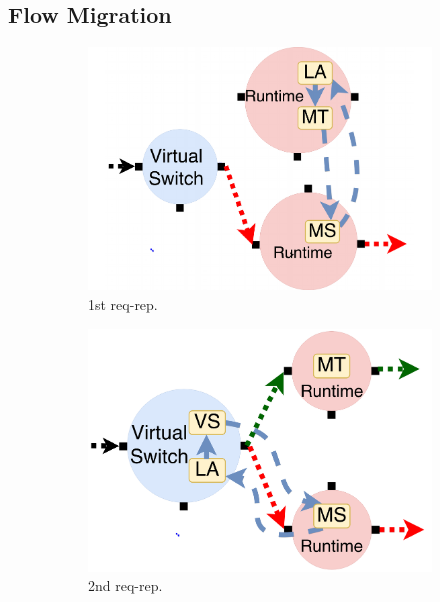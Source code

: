 \subsection{Flow Migration}

\begin{figure}[!t]
\begin{subfigure}[t]{0.33\linewidth}
   \centering
   \includegraphics[width=\columnwidth]{figure/nfactor-mig1.pdf}
   \caption{1st req-rep.}\label{fig:mig1}
  \end{subfigure}\hfill
  \begin{subfigure}[t]{0.33\linewidth}
     \centering
     \includegraphics[width=\columnwidth]{figure/nfactor-mig2.pdf}
     \caption{2nd req-rep.}\label{fig:mig2}
    \end{subfigure}\hfill
  \begin{subfigure}[t]{0.33\linewidth}

\end{subfigure}
\end{figure}
